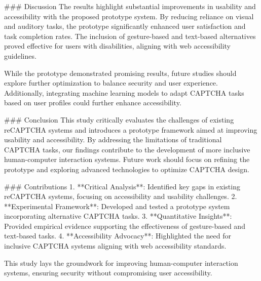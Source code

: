 ### Discussion  
The results highlight substantial improvements in usability and accessibility with the proposed prototype system. By reducing reliance on visual and auditory tasks, the prototype significantly enhanced user satisfaction and task completion rates. The inclusion of gesture-based and text-based alternatives proved effective for users with disabilities, aligning with web accessibility guidelines.  

While the prototype demonstrated promising results, future studies should explore further optimization to balance security and user experience. Additionally, integrating machine learning models to adapt CAPTCHA tasks based on user profiles could further enhance accessibility.  

### Conclusion  
This study critically evaluates the challenges of existing reCAPTCHA systems and introduces a prototype framework aimed at improving usability and accessibility. By addressing the limitations of traditional CAPTCHA tasks, our findings contribute to the development of more inclusive human-computer interaction systems. Future work should focus on refining the prototype and exploring advanced technologies to optimize CAPTCHA design.  

### Contributions  
1. **Critical Analysis**: Identified key gaps in existing reCAPTCHA systems, focusing on accessibility and usability challenges.  
2. **Experimental Framework**: Developed and tested a prototype system incorporating alternative CAPTCHA tasks.  
3. **Quantitative Insights**: Provided empirical evidence supporting the effectiveness of gesture-based and text-based tasks.  
4. **Accessibility Advocacy**: Highlighted the need for inclusive CAPTCHA systems aligning with web accessibility standards.  

This study lays the groundwork for improving human-computer interaction systems, ensuring security without compromising user accessibility.
